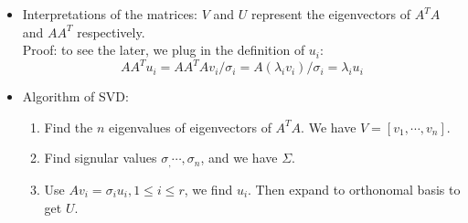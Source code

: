 \documentclass{report}
\begin{document}
\begin{itemize}
\item Interpretations of the matrices: $V$ and $U$ represent the eigenvectors of $A^T A$ and $A A^T$ respectively. \\
Proof: to see the later, we plug in the definition of $u_i$:  
\begin{equation}
A A^T u_i = A A^T A v_i / \sigma_i = A (\lambda_i v_i) / \sigma_i = \lambda_i u_i
\end{equation}

\item Algorithm of SVD: 
\begin{enumerate}
	\item Find the $n$ eigenvalues of eigenvectors of $A^T A$. We have $V = [v_1, \cdots, v_n]$. 
	
	\item Find signular values $\sigma_, \cdots, \sigma_n$, and we have $\Sigma$. 
	
	\item Use $A v_i = \sigma_i u_i, 1 \leq i \leq r$, we find $u_i$. Then expand to orthonomal basis to get $U$. 
\end{enumerate}
\end{itemize}
\end{document}
